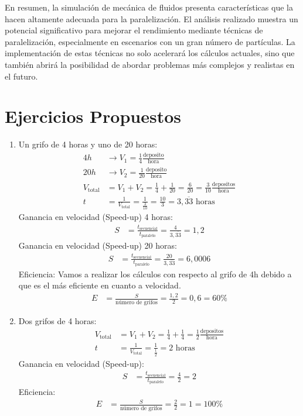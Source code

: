 \documentclass[12pt,a4paper]{article}
\begin{document}
	En resumen, la simulación de mecánica de fluidos presenta características que la hacen altamente adecuada para la paralelización. El análisis realizado muestra un potencial significativo para mejorar el rendimiento mediante técnicas de paralelización, especialmente en escenarios con un gran número de partículas. La implementación de estas técnicas no solo acelerará los cálculos actuales, sino que también abrirá la posibilidad de abordar problemas más complejos y realistas en el futuro.
	\newpage
	
	\section{Ejercicios Propuestos}
	\begin{enumerate}
		\item Un grifo de 4 horas y uno de 20 horas:
		\begin{align*}
			4h &\longrightarrow V_1 = \frac{1}{4} \frac{\text{deposito}}{\text{hora}} \\
			20h &\longrightarrow V_2 = \frac{1}{20} \frac{\text{deposito}}{\text{hora}} \\
			V_{\text{total}} &= V_1 + V_2 = \frac{1}{4} + \frac{1}{20} = \frac{6}{20} = \frac{3}{10} \frac{\text{depositos}}{\text{hora}} \\
			t &= \frac{1}{V_{\text{total}}} = \frac{1}{\frac{3}{10}} = \frac{10}{3} = 3,\overline{33} \text{ horas}
		\end{align*}
		Ganancia en velocidad (Speed-up) 4 horas:
		\begin{align*}
			S &= \frac{t_{\text{secuencial}}}{t_{\text{paralelo}}} = \frac{4}{3,\overline{33}} = 1,2
		\end{align*}
		Ganancia en velocidad (Speed-up) 20 horas:
		\begin{align*}
			S &= \frac{t_{\text{secuencial}}}{t_{\text{paralelo}}} = \frac{20}{3,\overline{33}} = 6,0006
		\end{align*}
		Eficiencia: \newline
		Vamos a realizar los cálculos con respecto al grifo de 4h debido a que es el más eficiente en cuanto a velocidad. 
		\begin{align*}
			E &= \frac{S}{\text{número de grifos}} = \frac{1,2}{2} = 0,6 = 60\%
		\end{align*}
		
		\item Dos grifos de 4 horas:
		\begin{align*}
			V_{\text{total}} &= V_1 + V_2 = \frac{1}{4} + \frac{1}{4} = \frac{1}{2} \frac{\text{depositos}}{\text{hora}} \\
			t &= \frac{1}{V_{\text{total}}} = \frac{1}{\frac{1}{2}} = 2 \text{ horas}
		\end{align*}
		Ganancia en velocidad (Speed-up):
		\begin{align*}
			S &= \frac{t_{\text{secuencial}}}{t_{\text{paralelo}}} = \frac{4}{2} = 2
		\end{align*}
		Eficiencia:
		\begin{align*}
			E &= \frac{S}{\text{número de grifos}} = \frac{2}{2} = 1 = 100\%
		\end{align*}
		

\end{enumerate}
\end{document}
